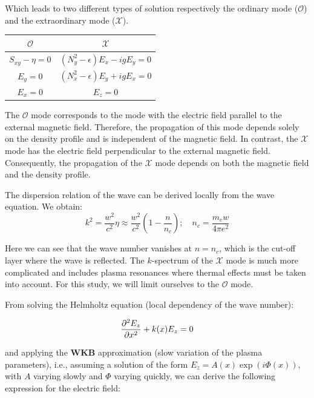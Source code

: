 \documentclass[11pt,openany]{report}
\begin{document}
\begin{multicols}{2}
    Which leads to two different types of solution respectively the ordinary mode ($\mathcal{O}$) and the extraordinary mode ($\mathcal{X}$).
    \setlength{\tabcolsep}{18pt}
    \renewcommand{\arraystretch}{1.5}
    \begin{center}
        \begin{tabular}{|| c  | c||}
            \hline
            $\mathcal{O}$       & $\mathcal{X}$                       \\
            \hline\hline
            $S_{xy} - \eta = 0$ & $(N_y^2 - \epsilon)E_x - igE_y = 0$ \\
            $E_y = 0$           & $(N_x^2 - \epsilon)E_y + igE_x = 0$ \\
            $E_x = 0$           & $E_z = 0$                           \\
            \hline
        \end{tabular}
    \end{center}

    The $\mathcal{O}$ mode corresponds to the mode with the electric field parallel to the external magnetic field. Therefore, the propagation of this mode depends solely on the density profile and is independent of the magnetic field. In contrast, the $\mathcal{X}$ mode has the electric field perpendicular to the external magnetic field. Consequently, the propagation of the $\mathcal{X}$ mode depends on both the magnetic field and the density profile.

    The dispersion relation of the wave can be derived locally from the wave equation. We obtain:
    \begin{equation}
        k^2 = \frac{w^2}{c^2} \eta \approx \frac{w^2}{c^2}\left(1 - \frac{n}{n_c}\right); \quad n_c = \frac{m_ew}{4 \pi e^2}
        \label{eq:Dispersion_relation}
    \end{equation}

    Here we can see that the wave number vanishes at \( n = n_c \), which is the cut-off layer where the wave is reflected. The \( k \)-spectrum of the $\mathcal{X}$ mode is much more complicated and includes plasma resonances where thermal effects must be taken into account. For this study, we will limit ourselves to the $\mathcal{O}$ mode.

    From solving the Helmholtz equation (local dependency of the wave number):

    $$
        \pdv[2]{E_z}{x} + k(x)E_z = 0
    $$

    and applying the \textbf{WKB} approximation (slow variation of the plasma parameters), i.e., assuming a solution of the form \( E_z = A(x) \exp(i\Phi(x)) \), with \( A \) varying slowly and \( \Phi \) varying quickly, we can derive the following expression for the electric field:


\end{multicols}
\end{document}
